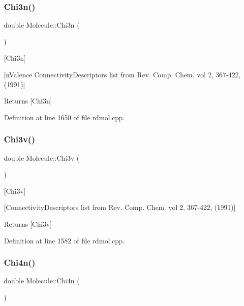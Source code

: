 \subsubsection{\texorpdfstring{Chi3n()}{Chi3n()}}
{\footnotesize\ttfamily double Molecule\+::\+Chi3n (\begin{DoxyParamCaption}{ }\end{DoxyParamCaption})}



\mbox{[}Chi3n\mbox{]} 

\mbox{[}n\+Valence Connectivity\+Descriptors list from Rev. Comp. Chem. vol 2, 367-\/422, (1991)\mbox{]}

\begin{DoxyReturn}{Returns}
\mbox{[}Chi3n\mbox{]} 
\end{DoxyReturn}


Definition at line 1650 of file rdmol.\+cpp.

\mbox{\label{class_molecule_ac708655c8a81d9e25fe414f43b1d0b1c}} 
\subsubsection{\texorpdfstring{Chi3v()}{Chi3v()}}
{\footnotesize\ttfamily double Molecule\+::\+Chi3v (\begin{DoxyParamCaption}{ }\end{DoxyParamCaption})}



\mbox{[}Chi3v\mbox{]} 

\mbox{[}Connectivity\+Descriptors list from Rev. Comp. Chem. vol 2, 367-\/422, (1991)\mbox{]}

\begin{DoxyReturn}{Returns}
\mbox{[}Chi3v\mbox{]} 
\end{DoxyReturn}


Definition at line 1582 of file rdmol.\+cpp.

\mbox{\label{class_molecule_a5724983b9e05e85161df48e5c8486d77}} 
\subsubsection{\texorpdfstring{Chi4n()}{Chi4n()}}
{\footnotesize\ttfamily double Molecule\+::\+Chi4n (\begin{DoxyParamCaption}{ }\end{DoxyParamCaption})}



